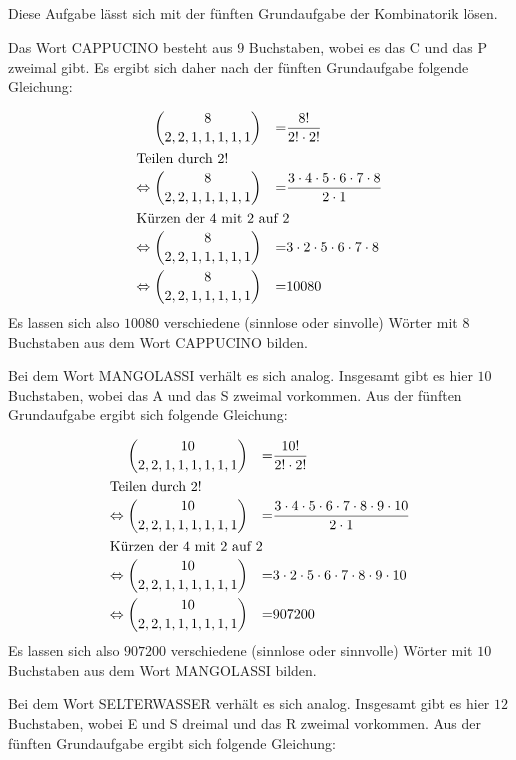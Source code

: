 \documentclass[10pt,a4paper,oneside,ngerman,numbers=noenddot]{scrartcl}
\begin{document}
\subsection{} %
Diese Aufgabe lässt sich mit der fünften Grundaufgabe der Kombinatorik lösen.

Das Wort CAPPUCINO besteht aus $9$ Buchstaben, wobei es das C und das P zweimal gibt. Es ergibt sich daher nach der fünften Grundaufgabe folgende Gleichung:

\begin{alignat}{2}
&\; \binom{8}{2,2,1,1,1,1,1} &=& \frac{8!}{2! \cdot 2!} \\
\intertext{Teilen durch $2!$}
\Leftrightarrow &\; \binom{8}{2,2,1,1,1,1,1} &=& \frac{3 \cdot 4 \cdot 5 \cdot 6 \cdot 7 \cdot 8}{2 \cdot 1} \\
\intertext{Kürzen der $4$ mit $2$ auf $2$}
\Leftrightarrow &\; \binom{8}{2,2,1,1,1,1,1} &=& 3 \cdot 2 \cdot 5 \cdot 6 \cdot 7 \cdot 8 \\
\Leftrightarrow &\; \binom{8}{2,2,1,1,1,1,1} &=& 10080
\end{alignat}
Es lassen sich also $10080$ verschiedene (sinnlose oder sinvolle) Wörter mit $8$ Buchstaben aus dem Wort CAPPUCINO bilden.

Bei dem Wort MANGOLASSI verhält es sich analog. Insgesamt gibt es hier $10$ Buchstaben, wobei das A und das S zweimal vorkommen. Aus der fünften Grundaufgabe ergibt sich folgende Gleichung:

\begin{alignat}{2}
&\; \binom{10}{2,2,1,1,1,1,1,1} &=& \frac{10!}{2! \cdot 2!} \\
\intertext{Teilen durch $2!$}
\Leftrightarrow &\; \binom{10}{2,2,1,1,1,1,1,1} &=& \frac{3 \cdot 4 \cdot 5 \cdot 6 \cdot 7 \cdot 8 \cdot 9 \cdot 10}{2 \cdot 1} \\
\intertext{Kürzen der $4$ mit $2$ auf $2$}
\Leftrightarrow &\; \binom{10}{2,2,1,1,1,1,1,1} &=& 3 \cdot 2 \cdot 5 \cdot 6 \cdot 7 \cdot 8 \cdot 9 \cdot 10 \\
\Leftrightarrow &\; \binom{10}{2,2,1,1,1,1,1,1} &=& 907200
\end{alignat}
Es lassen sich also $907200$ verschiedene (sinnlose oder sinnvolle) Wörter mit $10$ Buchstaben aus dem Wort MANGOLASSI bilden.

Bei dem Wort SELTERWASSER verhält es sich analog. Insgesamt gibt es hier $12$ Buchstaben, wobei E und S dreimal und das R zweimal vorkommen. Aus der fünften Grundaufgabe ergibt sich folgende Gleichung:
\end{document}
